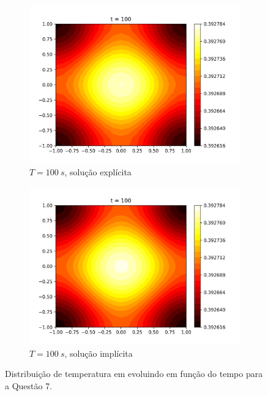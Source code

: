 \documentclass{article}
\begin{document}
\begin{figure}[h]
\begin{subfigure}[b]{0.49\textwidth}
         \includegraphics[width=\textwidth]{figs/q7a_heatmap_t100.png}
         \caption{$T=100~s$, solução explícita}
	\label{fig:q7a_heatmap_t100}
     \end{subfigure}
     \hfill
     \begin{subfigure}[b]{0.49\textwidth}
         \centering
     \includegraphics[width=\textwidth]{figs/q7b_heatmap_t100.png}
         \caption{$T=100~s$, solução implícita}
	\label{fig:q7b_heatmap_t100}
     \end{subfigure}
\caption{Distribuição de temperatura em evoluindo em função do tempo para a Questão 7.}
\end{figure}
\end{document}
